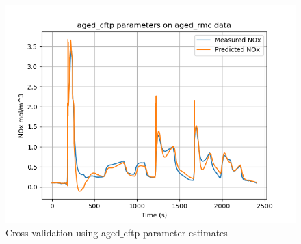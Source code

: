\begin{figure}[H]
\begin{minipage}{0.3\textwidth}
                \includegraphics[width = \textwidth]{./figs/figs_new_mdl/aged_cftp_aged_rmc.png}
        \end{minipage}
        \caption{Cross validation using aged$\_$cftp parameter estimates}
\end{figure}

